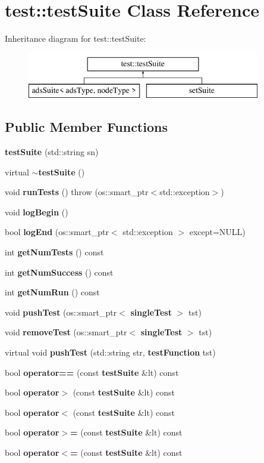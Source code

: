 \section{test\+:\+:test\+Suite Class Reference}
\label{classtest_1_1testSuite}
Inheritance diagram for test\+:\+:test\+Suite\+:\begin{figure}[H]
\begin{center}
\leavevmode
\includegraphics[height=2.000000cm]{classtest_1_1testSuite}
\end{center}
\end{figure}
\subsection*{Public Member Functions}
\begin{DoxyCompactItemize}
\item 
{\bf test\+Suite} (std\+::string sn)
\item 
virtual {\bf $\sim$test\+Suite} ()
\item 
void {\bf run\+Tests} ()  throw (os\+::smart\+\_\+ptr$<$std\+::exception$>$)
\item 
void {\bf log\+Begin} ()
\item 
bool {\bf log\+End} (os\+::smart\+\_\+ptr$<$ std\+::exception $>$ except=N\+U\+LL)
\item 
int {\bf get\+Num\+Tests} () const 
\item 
int {\bf get\+Num\+Success} () const 
\item 
int {\bf get\+Num\+Run} () const 
\item 
void {\bf push\+Test} (os\+::smart\+\_\+ptr$<$ {\bf single\+Test} $>$ tst)
\item 
void {\bf remove\+Test} (os\+::smart\+\_\+ptr$<$ {\bf single\+Test} $>$ tst)
\item 
virtual void {\bf push\+Test} (std\+::string str, {\bf test\+Function} tst)
\item 
bool {\bf operator==} (const {\bf test\+Suite} \&lt) const 
\item 
bool {\bf operator$>$} (const {\bf test\+Suite} \&lt) const 
\item 
bool {\bf operator$<$} (const {\bf test\+Suite} \&lt) const 
\item 
bool {\bf operator$>$=} (const {\bf test\+Suite} \&lt) const 
\item 
bool {\bf operator$<$=} (const {\bf test\+Suite} \&lt) const 
\end{DoxyCompactItemize}
